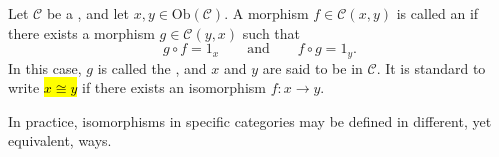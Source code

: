 \begin{definition} \label{definition:isomorphism_in_a_category}
Let $\mathcal{C}$ be a , and let $x,y \in \mathrm{Ob}(\mathcal{C})$.  
A morphism $f \in \mathcal{C}(x,y)$ is called an  if there exists a morphism $g \in \mathcal{C}(y,x)$ such that
$$ g \circ f = 1_x \qquad \text{and} \qquad f \circ g = 1_y.  $$
In this case, $g$ is called the , and $x$ and $y$ are said to be  in $\mathcal{C}$. It is standard to write \hl{$x \cong y$} if there exists an isomorphism $f : x \to y$.

In practice, isomorphisms in specific categories may be defined in different, yet equivalent, ways.
\end{definition}
